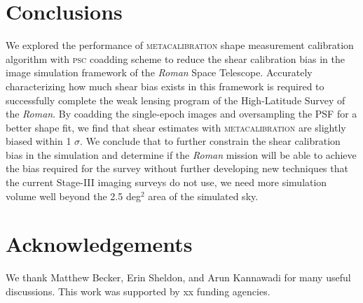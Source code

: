 \documentclass[fleqn,usenatbib]{mnras}
\begin{document}
\section{Conclusions}
\label{sec:conclusion}
We explored the performance of \textsc{metacalibration} shape measurement calibration algorithm with \textsc{psc} coadding scheme to reduce the shear calibration bias in the image simulation framework of the \emph{Roman} Space Telescope. Accurately characterizing how much shear bias exists in this framework is required to successfully complete the weak lensing program of the High-Latitude Survey of the \emph{Roman}. By coadding the single-epoch images and oversampling the PSF for a better shape fit, we find that shear estimates with \textsc{metacalibration} are slightly biased within 1 $\sigma$. We conclude that to further constrain the shear calibration bias in the simulation and determine if the \emph{Roman} mission will be able to achieve the bias required for the survey without further developing new techniques that the current Stage-III imaging surveys do not use, we need more simulation volume well beyond the 2.5 deg$^{2}$ area of the simulated sky. 



\section{Acknowledgements}

We thank Matthew Becker, Erin Sheldon, and Arun Kannawadi for many useful discussions. This work was supported by xx funding agencies.


 
\end{document}
